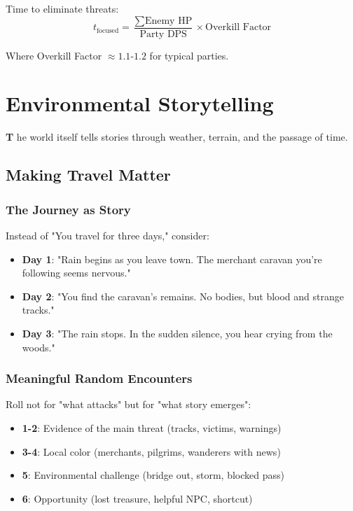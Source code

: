 \documentclass[11pt,letterpaper,openany]{book}
\newcommand{\firstletter}[1]{%
    \textcolor{bloodred}{\fontsize{48}{48}\selectfont\bfseries #1}%
}
\begin{document}
Time to eliminate threats:
\begin{equation}
t_{\text{focused}} = \frac{\sum \text{Enemy HP}}{\text{Party DPS}} \times \text{Overkill Factor}
\end{equation}

Where Overkill Factor $\approx 1.1$-$1.2$ for typical parties.

\chapter{Environmental Storytelling}

\firstletter{T}he world itself tells stories through weather, terrain, and the passage of time.

\section{Making Travel Matter}

\subsection{The Journey as Story}

Instead of "You travel for three days," consider:
\begin{itemize}
    \item \textbf{Day 1}: "Rain begins as you leave town. The merchant caravan you're following seems nervous."
    \item \textbf{Day 2}: "You find the caravan's remains. No bodies, but blood and strange tracks."
    \item \textbf{Day 3}: "The rain stops. In the sudden silence, you hear crying from the woods."
\end{itemize}

\subsection{Meaningful Random Encounters}

Roll not for "what attacks" but for "what story emerges":
\begin{itemize}
    \item \textbf{1-2}: Evidence of the main threat (tracks, victims, warnings)
    \item \textbf{3-4}: Local color (merchants, pilgrims, wanderers with news)
    \item \textbf{5}: Environmental challenge (bridge out, storm, blocked pass)
    \item \textbf{6}: Opportunity (lost treasure, helpful NPC, shortcut)
\end{itemize}
\end{document}
